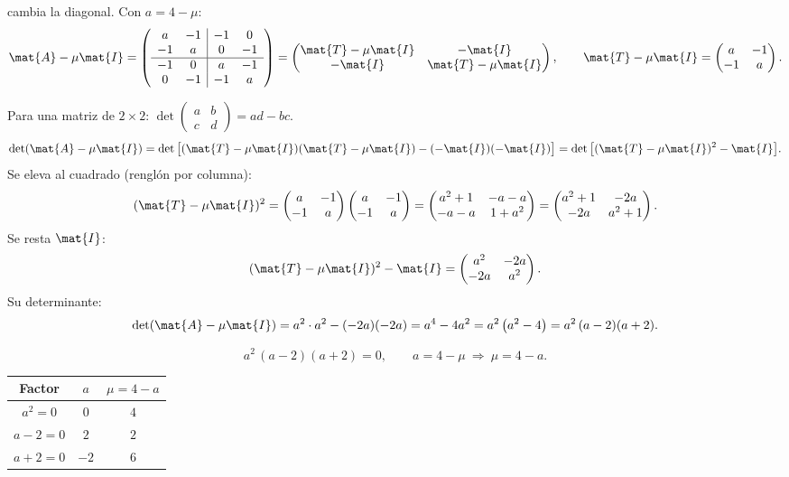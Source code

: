 cambia la diagonal. Con $a = 4 - \mu$:
\[
\mat{A} - \mu\mat{I} =
\left(\begin{array}{cc|cc}
	a & -1 & -1 &  0\\
	-1 &  a &  0 & -1\\ \hline
	-1 &  0 &  a & -1\\
	0 & -1 & -1 &  a
\end{array}\right)
= \begin{pmatrix} \mat{T} - \mu\mat{I} & -\mat{I}\\ -\mat{I} & \mat{T} - \mu\mat{I} \end{pmatrix},
\qquad
\mat{T} - \mu\mat{I} = \begin{pmatrix} a & -1\\ -1 & a \end{pmatrix}.
\]

Para una matriz de $2\times2$: $\det\begin{pmatrix} a & b\\ c & d \end{pmatrix} = ad - bc$. 
\[
\det(\mat{A} - \mu\mat{I})
= \det\big[(\mat{T} - \mu\mat{I})(\mat{T} - \mu\mat{I}) - (-\mat{I})(-\mat{I})\big]
= \det\big[(\mat{T} - \mu\mat{I})^2 - \mat{I}\big].
\]
Se eleva al cuadrado (renglón por columna):
\[
(\mat{T} - \mu\mat{I})^2 =
\begin{pmatrix} a & -1\\ -1 & a \end{pmatrix}
\begin{pmatrix} a & -1\\ -1 & a \end{pmatrix}
= \begin{pmatrix} a^2 + 1 & -a - a\\ -a - a & 1 + a^2 \end{pmatrix}
= \begin{pmatrix} a^2 + 1 & -2a\\ -2a & a^2 + 1 \end{pmatrix}.
\]
Se resta $\mat{I}$:
\[
(\mat{T} - \mu\mat{I})^2 - \mat{I} = \begin{pmatrix} a^2 & -2a\\ -2a & a^2 \end{pmatrix}.
\]
Su determinante:
\[
\det(\mat{A} - \mu\mat{I}) = a^2\cdot a^2 - (-2a)(-2a) = a^4 - 4a^2 = a^2\left(a^2 - 4\right) = a^2\,(a - 2)(a + 2).
\]

\[
a^2\,(a - 2)(a + 2) = 0, \qquad a = 4 - \mu \ \Longrightarrow\ \mu = 4 - a .
\]
\begin{center}
	\begin{tabular}{|c|c|c|}
		\hline
		Factor & $a$ & $\mu = 4 - a$\\
		\hline
		$a^2 = 0$ & $0$ & $4$ \\
		$a - 2 = 0$ & $2$ & $2$\\
		$a + 2 = 0$ & $-2$ & $6$\\
		\hline
	\end{tabular}
\end{center}

